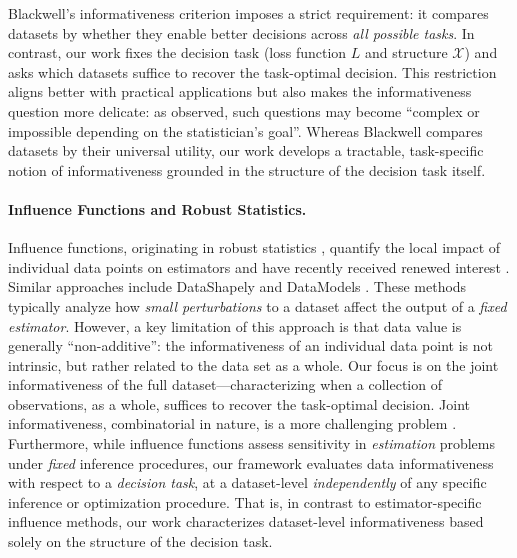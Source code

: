 \documentclass[11pt]{article}
\theoremstyle{plain}
\theoremstyle{definition}
\newcommand{\cX}{\mathcal{X}}
\begin{document}
Blackwell's informativeness criterion imposes a strict requirement: it compares datasets by whether they enable better decisions across \textit{all possible tasks}.
In contrast, our work fixes the decision task (loss function $L$ and structure $\cX$) and asks which datasets suffice to recover the task-optimal decision. This restriction aligns better with practical applications but also makes the informativeness question more delicate: as \citet{lecamComparisonExperimentsShort1996} observed, such questions may become ``complex or impossible depending on the statistician’s goal''. Whereas Blackwell compares datasets by their universal utility, our work develops a tractable, task-specific notion of informativeness grounded in the structure of the decision task itself. 



\paragraph{Influence Functions and Robust Statistics.}
Influence functions, originating in robust statistics \citep{huberRobustEstimation1992, hampelRobustStatisticsApproach1986}, quantify the local impact of individual data points on estimators and have recently received renewed interest \citep{broderickAutomaticFiniteSampleRobustness2023}.
Similar approaches include DataShapely \citep{jiangOpenDataValUnified2023, jiangOpenDataValUnified2023} and DataModels \citep{ilyasDatamodelsUnderstanding2022, dassDataMILSelecting2025}.
These methods typically analyze how \textit{small perturbations} to a dataset affect the output of a \textit{fixed estimator}. However, a key limitation of this approach is that data value is generally ``non-additive'': the informativeness of an individual data point is not intrinsic, but rather related to the data set as a whole. Our focus is on the joint informativeness of the full dataset---characterizing when a collection of observations, as a whole, suffices to recover the task-optimal decision. Joint informativeness, combinatorial in nature, is a more challenging problem \citep{freundPracticalRobustnessAuditing2023,rubinsteinRobustnessAuditingLinear2024}. 
Furthermore, while influence functions assess sensitivity in \textit{estimation} problems under \textit{fixed} inference procedures, our framework evaluates data informativeness with respect to a \textit{decision task}, at a dataset-level \textit{independently} of any specific inference or optimization procedure. That is, in contrast to estimator-specific influence methods, our work characterizes dataset-level informativeness based solely on the structure of the decision task. 
\end{document}
